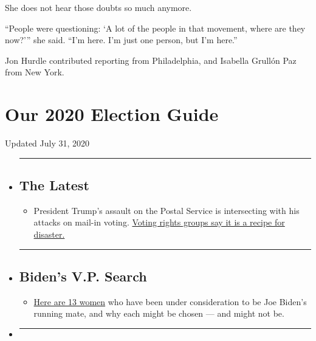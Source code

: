 She does not hear those doubts so much anymore.

``People were questioning: `A lot of the people in that movement, where
are they now?''' she said. ``I'm here. I'm just one person, but I'm
here.''

Jon Hurdle contributed reporting from Philadelphia, and Isabella Grullón
Paz from New York.

\hypertarget{our-2020-election-guide}{%
\section{Our 2020 Election Guide}\label{our-2020-election-guide}}

Updated July 31, 2020

\begin{itemize}
\item
  \begin{center}\rule{0.5\linewidth}{\linethickness}\end{center}

  \hypertarget{the-latest}{%
  \subsection{The Latest}\label{the-latest}}

  \begin{itemize}
  \tightlist
  \item
    President Trump's assault on the Postal Service is intersecting with
    his attacks on mail-in voting.
    \href{https://www.nytimes.com/2020/07/31/us/politics/trump-usps-mail-delays.html?action=click\&pgtype=Article\&state=default\&region=BELOW_MAIN_CONTENT\&context=storylines_guide}{Voting
    rights groups say it is a recipe for disaster.}
  \end{itemize}
\item
  \begin{center}\rule{0.5\linewidth}{\linethickness}\end{center}

  \hypertarget{bidens-vp-search}{%
  \subsection{Biden's V.P. Search}\label{bidens-vp-search}}

  \begin{itemize}
  \tightlist
  \item
    \href{https://www.nytimes.com/article/biden-vice-president-2020.html?action=click\&pgtype=Article\&state=default\&region=BELOW_MAIN_CONTENT\&context=storylines_guide}{Here
    are 13 women} who have been under consideration to be Joe Biden's
    running mate, and why each might be chosen --- and might not be.
  \end{itemize}
\item
  \begin{center}\rule{0.5\linewidth}{\linethickness}\end{center}


\end{itemize}
